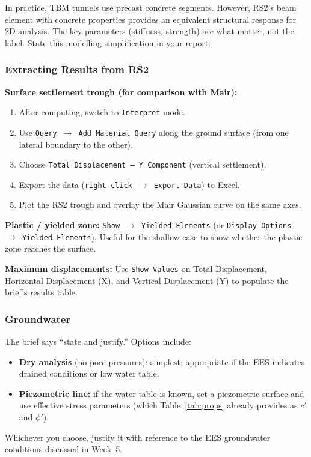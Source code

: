 \documentclass[a4paper,12pt]{article}
\begin{document}
\begin{notebox}
In practice, TBM tunnels use precast concrete segments. However, RS2's beam element with concrete properties provides an equivalent structural response for 2D analysis. The key parameters (stiffness, strength) are what matter, not the label. State this modelling simplification in your report.
\end{notebox}

\subsubsection{Extracting Results from RS2}
\textbf{Surface settlement trough (for comparison with Mair):}
\begin{enumerate}
    \item After computing, switch to \texttt{Interpret} mode.
    \item Use \texttt{Query $\to$ Add Material Query} along the ground surface (from one lateral boundary to the other).
    \item Choose \texttt{Total Displacement -- Y Component} (vertical settlement).
    \item Export the data (\texttt{right-click $\to$ Export Data}) to Excel.
    \item Plot the RS2 trough and overlay the Mair Gaussian curve on the same axes.
\end{enumerate}

\textbf{Plastic / yielded zone:} \texttt{Show $\to$ Yielded Elements} (or \texttt{Display Options $\to$ Yielded Elements}). Useful for the shallow case to show whether the plastic zone reaches the surface.

\textbf{Maximum displacements:} Use \texttt{Show Values} on Total Displacement, Horizontal Displacement (X), and Vertical Displacement (Y) to populate the brief's results table.

\subsubsection{Groundwater}
The brief says ``state and justify.'' Options include:
\begin{itemize}
    \item \textbf{Dry analysis} (no pore pressures): simplest; appropriate if the EES indicates drained conditions or low water table.
    \item \textbf{Piezometric line:} if the water table is known, set a piezometric surface and use effective stress parameters (which Table~\ref{tab:props} already provides as $c'$ and $\phi'$).
\end{itemize}
Whichever you choose, justify it with reference to the EES groundwater conditions discussed in Week~5.
\end{document}
